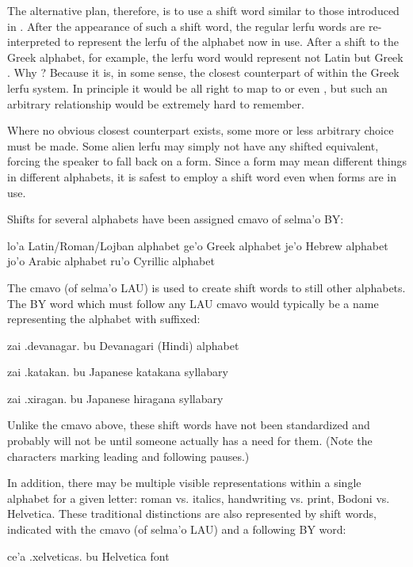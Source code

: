 The alternative plan, therefore, is to use a shift word similar
    to those introduced in . After the
    appearance of such a shift word, the regular lerfu words are
    re-interpreted to represent the lerfu of the alphabet now in
    use. After a shift to the Greek alphabet, for example, the
    lerfu word  would represent not Latin  but Greek
    . Why ? Because it is, in some sense, the closest
    counterpart of  within the Greek lerfu system. In
    principle it would be all right to map  to  or
    even , but such an arbitrary relationship would be
    extremely hard to remember. 

Where no obvious closest counterpart exists, some more or
    less arbitrary choice must be made. Some alien lerfu may simply
    not have any shifted equivalent, forcing the speaker to fall
    back on a  form. Since a  form may mean different
    things in different alphabets, it is safest to employ a shift
    word even when  forms are in use.

Shifts for several alphabets have been assigned cmavo of
    selma'o BY:

   lo'a    Latin/Roman/Lojban alphabet
    ge'o    Greek alphabet
    je'o    Hebrew alphabet
    jo'o    Arabic alphabet
    ru'o    Cyrillic alphabet

The cmavo  (of selma'o LAU) is used to create shift
    words to still other alphabets. The BY word which must follow
    any LAU cmavo would typically be a name representing the
    alphabet with  suffixed:
\begin{example}
zai .devanagar. bu\n
Devanagari (Hindi) alphabet
\end{example}

\begin{example}
zai .katakan. bu\n
Japanese katakana syllabary
\end{example}

\begin{example}
zai .xiragan. bu\n
Japanese hiragana syllabary
\end{example}

Unlike the cmavo above, these shift words have not been
    standardized and probably will not be until someone actually
    has a need for them. (Note the  characters marking leading
    and following pauses.) 

In addition, there may be multiple visible representations
    within a single alphabet for a given letter: roman vs. italics,
    handwriting vs. print, Bodoni vs. Helvetica. These traditional
     distinctions are also represented by shift
    words, indicated with the cmavo  (of selma'o LAU) and a
    following BY word:
\begin{example}
ce'a .xelveticas. bu\n
Helvetica font
\end{example}

